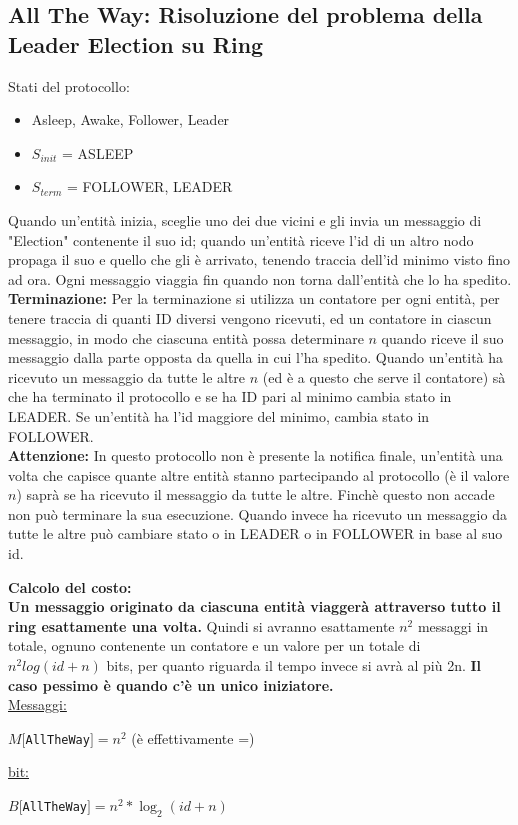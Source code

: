 \subsection{All The Way: Risoluzione del problema della Leader Election su Ring}
Stati del protocollo:
\begin{itemize}
    \item Asleep, Awake, Follower, Leader
    \item $S_{init}$ = ASLEEP
    \item $S_{term}$ = FOLLOWER, LEADER
\end{itemize}
Quando un'entità inizia, sceglie uno dei due vicini e gli invia un messaggio di "Election" contenente il suo id; quando un'entità riceve l'id di un altro nodo propaga il suo e quello che gli è arrivato, tenendo traccia dell'id minimo visto fino ad ora. Ogni messaggio viaggia fin quando non torna dall'entità che lo ha spedito.\\
\textbf{Terminazione:} Per la terminazione si utilizza un contatore per ogni entità, per tenere traccia di quanti ID diversi vengono ricevuti, ed un contatore in ciascun messaggio, in modo che ciascuna entità possa determinare $n$ quando riceve il suo messaggio dalla parte opposta da quella in cui l'ha spedito. Quando un'entità ha ricevuto un messaggio da tutte le altre $n$ (ed è a questo che serve il contatore) sà che ha terminato il protocollo e se ha ID pari al minimo cambia stato in LEADER. Se un'entità ha l'id maggiore del minimo, cambia stato in FOLLOWER.\\
\textbf{Attenzione:} In questo protocollo non è presente la notifica finale, un'entità una volta che capisce quante altre entità stanno partecipando al protocollo (è il valore $n$) saprà se ha ricevuto il messaggio da tutte le altre. Finchè questo non accade non può terminare la sua esecuzione. Quando invece ha ricevuto un messaggio da tutte le altre può cambiare stato o in LEADER o in FOLLOWER in base al suo id.

\textbf{Calcolo del costo:}\\ \textbf{Un messaggio originato da ciascuna entità viaggerà attraverso tutto il ring esattamente una volta.} Quindi si avranno esattamente $n^2$ messaggi in totale, ognuno contenente un contatore e un valore per un totale di $n^2log(id+n)$ bits, per quanto riguarda il tempo invece si avrà al più 2n. \textbf{Il caso pessimo è quando c'è un unico iniziatore.}\\
\underline{Messaggi:}
\begin{center}
  $M[$\texttt{AllTheWay}$] = n^2$ (è effettivamente =)
\end{center}
\underline{bit:}
\begin{center}
  $B[$\texttt{AllTheWay}$] = n^2*\log_2(id+n)$
\end{center}


